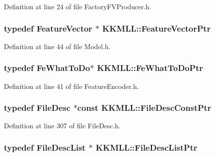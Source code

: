 Definition at line 24 of file Factory\+F\+V\+Producer.\+h.

\subsubsection[{\texorpdfstring{Feature\+Vector\+Ptr}{FeatureVectorPtr}}]{\setlength{\rightskip}{0pt plus 5cm}typedef {\bf Feature\+Vector} $\ast$ {\bf K\+K\+M\+L\+L\+::\+Feature\+Vector\+Ptr}}\hypertarget{namespace_k_k_m_l_l_a0c5df3d48f45926fbc4fee04f5e3bc04}{}\label{namespace_k_k_m_l_l_a0c5df3d48f45926fbc4fee04f5e3bc04}


Definition at line 44 of file Model.\+h.

\subsubsection[{\texorpdfstring{Fe\+What\+To\+Do\+Ptr}{FeWhatToDoPtr}}]{\setlength{\rightskip}{0pt plus 5cm}typedef {\bf Fe\+What\+To\+Do}$\ast$ {\bf K\+K\+M\+L\+L\+::\+Fe\+What\+To\+Do\+Ptr}}\hypertarget{namespace_k_k_m_l_l_a854b1f772a2399657c139db26f252b0f}{}\label{namespace_k_k_m_l_l_a854b1f772a2399657c139db26f252b0f}


Definition at line 41 of file Feature\+Encoder.\+h.

\subsubsection[{\texorpdfstring{File\+Desc\+Const\+Ptr}{FileDescConstPtr}}]{\setlength{\rightskip}{0pt plus 5cm}typedef {\bf File\+Desc} $\ast$const {\bf K\+K\+M\+L\+L\+::\+File\+Desc\+Const\+Ptr}}\hypertarget{namespace_k_k_m_l_l_a7aa258340f9147d1b257c8eb81450e80}{}\label{namespace_k_k_m_l_l_a7aa258340f9147d1b257c8eb81450e80}


Definition at line 307 of file File\+Desc.\+h.

\subsubsection[{\texorpdfstring{File\+Desc\+List\+Ptr}{FileDescListPtr}}]{\setlength{\rightskip}{0pt plus 5cm}typedef {\bf File\+Desc\+List} $\ast$ {\bf K\+K\+M\+L\+L\+::\+File\+Desc\+List\+Ptr}}\hypertarget{namespace_k_k_m_l_l_a192445fd15bc29cfd6713538ef9cf794}{}\label{namespace_k_k_m_l_l_a192445fd15bc29cfd6713538ef9cf794}


